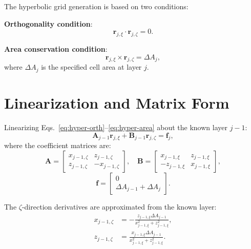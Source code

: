 \documentclass[11pt,a4paper]{report}
\newcommand{\rvec}{\bm{r}}
\begin{document}
The hyperbolic grid generation is based on two conditions:

\textbf{Orthogonality condition}:
\begin{equation}
    \rvec_{j,\xi} \cdot \rvec_{j,\zeta} = 0.
    \label{eq:hyper-orth}
\end{equation}

\textbf{Area conservation condition}:
\begin{equation}
    \rvec_{j,\xi} \times \rvec_{j,\zeta} = \Delta A_j,
    \label{eq:hyper-area}
\end{equation}
where $\Delta A_j$ is the specified cell area at layer $j$.

\section{Linearization and Matrix Form}

Linearizing Eqs.~\eqref{eq:hyper-orth}--\eqref{eq:hyper-area} about the known layer $j-1$:
\begin{equation}
    \bm{A}_{j-1} \rvec_{j,\xi} + \bm{B}_{j-1} \rvec_{j,\zeta} = \bm{f}_j,
\end{equation}
where the coefficient matrices are:
\begin{equation}
    \bm{A} = \begin{bmatrix} x_{j-1,\zeta} & z_{j-1,\zeta} \\ z_{j-1,\zeta} & -x_{j-1,\zeta} \end{bmatrix}, \quad
    \bm{B} = \begin{bmatrix} x_{j-1,\xi} & z_{j-1,\xi} \\ -z_{j-1,\xi} & x_{j-1,\xi} \end{bmatrix},
\end{equation}
\begin{equation}
    \bm{f} = \begin{bmatrix} 0 \\ \Delta A_{j-1} + \Delta A_j \end{bmatrix}.
\end{equation}

The $\zeta$-direction derivatives are approximated from the known layer:
\begin{equation}
\begin{aligned}
    x_{j-1,\zeta} &= -\frac{z_{j-1,\xi} \Delta A_{j-1}}{x_{j-1,\xi}^2 + z_{j-1,\xi}^2}, \\
    z_{j-1,\zeta} &= \frac{x_{j-1,\xi} \Delta A_{j-1}}{x_{j-1,\xi}^2 + z_{j-1,\xi}^2}.
\end{aligned}
\end{equation}
\end{document}
